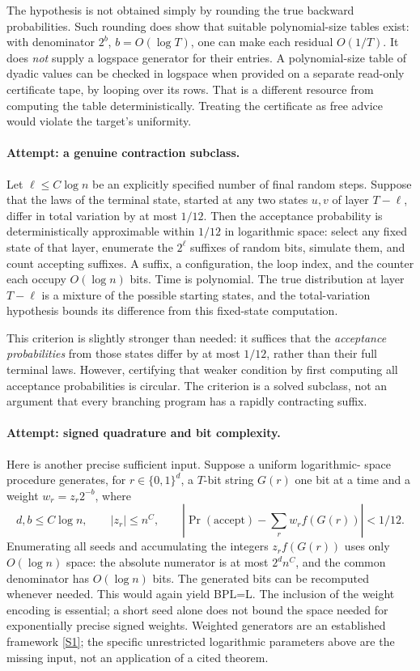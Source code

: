 \documentclass[11pt,a4paper]{article}
\newcommand{\sref}[2]{\hyperlink{source:#1:#2}{[S#2]}}
\numberwithin{equation}{section}
\begin{document}
The hypothesis is not obtained simply by rounding the true backward
probabilities. Such rounding does show that suitable polynomial-size
tables exist: with denominator $2^b$, $b=O(\log T)$, one can make each
residual $O(1/T)$. It does \emph{not} supply a logspace generator for their
entries. A polynomial-size table of dyadic values can be checked in
logspace when provided on a separate read-only certificate tape, by
looping over its rows. That is a different resource from computing the
table deterministically. Treating the certificate as free advice would
violate the target's uniformity.

\paragraph{Attempt: a genuine contraction subclass.}
Let $\ell\le C\log n$ be an explicitly specified number of final random
steps. Suppose that the laws of the terminal state, started at any two
states $u,v$ of layer $T-\ell$, differ in total variation by at most
$1/12$. Then the acceptance probability is deterministically
approximable within $1/12$ in logarithmic space: select any fixed state
of that layer, enumerate the $2^\ell$ suffixes of random bits, simulate
them, and count accepting suffixes. A suffix, a configuration, the loop
index, and the counter each occupy $O(\log n)$ bits. Time is polynomial.
The true distribution at layer $T-\ell$ is a mixture of the possible
starting states, and the total-variation hypothesis bounds its difference
from this fixed-state computation.

This criterion is slightly stronger than needed: it suffices that the
\emph{acceptance probabilities} from those states differ by at most
$1/12$, rather than their full terminal laws. However, certifying that
weaker condition by first computing all acceptance probabilities is
circular. The criterion is a solved subclass, not an argument that every
branching program has a rapidly contracting suffix.

\paragraph{Attempt: signed quadrature and bit complexity.}
Here is another precise sufficient input. Suppose a uniform logarithmic-
space procedure generates, for $r\in\{0,1\}^d$, a $T$-bit string $G(r)$
one bit at a time and a weight $w_r=z_r2^{-b}$, where
\[
 d,b\le C\log n,\qquad |z_r|\le n^C,
 \qquad
 \left|\Pr(\mathrm{accept})-\sum_r w_r f(G(r))\right|<1/12.
\]
Enumerating all seeds and accumulating the integers $z_rf(G(r))$ uses
only $O(\log n)$ space: the absolute numerator is at most
$2^d n^C$, and the common denominator has $O(\log n)$ bits. The generated
bits can be recomputed whenever needed. This would again yield BPL=L.
The inclusion of the weight encoding is essential; a short seed alone
does not bound the space needed for exponentially precise signed weights.
Weighted generators are an established framework \sref{statement}{1}; the
specific unrestricted logarithmic parameters above are the missing input,
not an application of a cited theorem.
\end{document}
